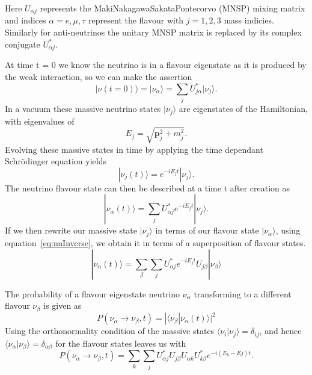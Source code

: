 Here $U_{\alpha j}$ represents the Maki\textendash Nakagawa\textendash Sakata\textendash Pontecorvo (MNSP) mixing matrix and indices $\alpha = e , \mu , \tau $ represent the flavour with $j =1,2,3$ mass indicies. Similarly for anti-neutrinos the unitary MNSP matrix is replaced by its complex conjugate $U_{\alpha j}^{\ast}$.


At time t = 0 we know the neutrino is in a flavour eigenstate as it is produced by the weak interaction, so we can make the assertion
\begin{equation}
|\nu(t = 0)\rangle = |\nu_{\alpha}\rangle = \sum_{j}U_{j \alpha}^{\ast}|\nu_{j}\rangle.
\end{equation}
In a vacuum these massive neutrino states $|\nu_{j}\rangle$ are eigenstates of the Hamiltonian, with eigenvalues of
\begin{equation}
E_{j} = \sqrt{\textbf{p}_{j}^{2} + m_{j}^{2}}.
\end{equation}
Evolving these massive states in time by applying the time dependant Schr\"{o}dinger equation yields
\begin{equation}
|\nu_{j}(t)\rangle = e^{-iE_{j}t}|\nu_{j}\rangle.
\end{equation}
The neutrino flavour state can then be described at a time t after creation as
\begin{equation}
|\nu_{\alpha}(t)\rangle = \sum_{j}U_{\alpha j}^{\ast}e^{-iE_{j}t}|\nu_{j}\rangle. 
\end{equation}
If we then rewrite our massive state $|\nu_{j}\rangle$ in terms of our flavour state $|\nu_{\alpha}\rangle$, using equation~\ref{eq:nuInverse}, we obtain it in terms of a superposition of flavour states.
\begin{equation}
|\nu_{\alpha}(t)\rangle = \sum_{\beta}\sum_{j}U_{\alpha j}^{\ast}e^{-iE_{j}t}U_{j \beta}|\nu_{\beta}\rangle
\end{equation}

The probability of a flavour eigenstate neutrino $\nu_{\alpha}$ transforming to a different flavour  $\nu_{\beta}$ is given as
\begin{equation}
P(\nu_{\alpha} \to \nu_{\beta},t) = |\langle\nu_{\beta}|\nu_{\alpha}(t)\rangle|^2
\end{equation}
Using the orthonormality condition of the massive states $\langle\nu_{i}|\nu_{j}\rangle = \delta_{ij}$, and hence $\langle\nu_{\alpha}|\nu_{\beta}\rangle = \delta_{\alpha\beta}$ for the flavour states leaves us with
\begin{equation}
P(\nu_{\alpha} \to \nu_{\beta},t) = \sum_{k}\sum_{j}U_{\alpha j}^{\ast}U_{j \beta}U_{\alpha k}U_{k \beta}^{\ast}e^{-i(E_{k} - E{j}) t}.
\label{eq:nuProb}
\end{equation}

